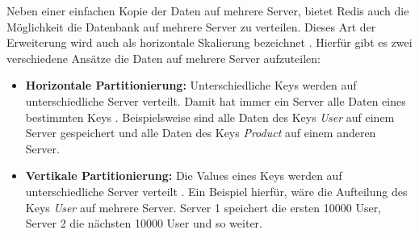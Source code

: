 Neben einer einfachen Kopie der Daten auf mehrere Server, bietet Redis auch die Möglichkeit die Datenbank auf mehrere Server zu verteilen.
Dieses Art der Erweiterung wird auch als horizontale Skalierung bezeichnet \cite{Fasel2016}.
Hierfür gibt es zwei verschiedene Ansätze die Daten auf mehrere Server aufzuteilen:
\begin{itemize}
    \item \textbf{Horizontale Partitionierung:} Unterschiedliche Keys werden auf unterschiedliche Server verteilt. Damit hat immer ein Server alle Daten eines bestimmten Keys \cite[148-149]{12}. 
    Beispielsweise sind alle Daten des Keys \textit{User} auf einem Server gespeichert und alle Daten des Keys \textit{Product} auf einem anderen Server. 
    \item \textbf{Vertikale Partitionierung:} Die Values eines Keys werden auf unterschiedliche Server verteilt \cite[148-149]{12}. 
    Ein Beispiel hierfür, wäre die Aufteilung des Keys \textit{User} auf mehrere Server. Server 1 speichert die ersten 10000 User, Server 2 die nächsten 10000 User und so weiter.
\end{itemize}



